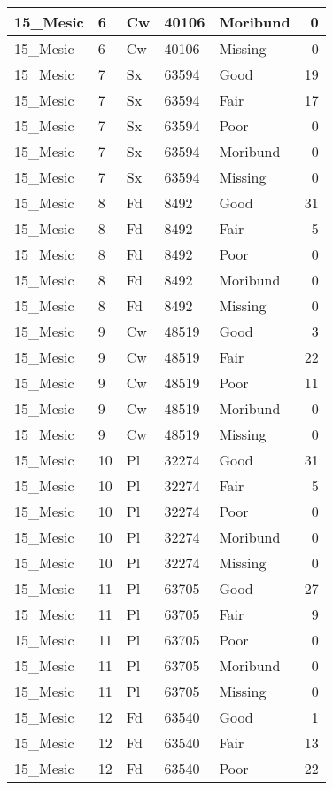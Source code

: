 \documentclass[
]{article}
\begin{document}
\begin{tabular}{l|l|l|l|l|r}
\hline
15\_Mesic & 6 & Cw & 40106 & Moribund & 0\\
\hline
15\_Mesic & 6 & Cw & 40106 & Missing & 0\\
\hline
15\_Mesic & 7 & Sx & 63594 & Good & 19\\
\hline
15\_Mesic & 7 & Sx & 63594 & Fair & 17\\
\hline
15\_Mesic & 7 & Sx & 63594 & Poor & 0\\
\hline
15\_Mesic & 7 & Sx & 63594 & Moribund & 0\\
\hline
15\_Mesic & 7 & Sx & 63594 & Missing & 0\\
\hline
15\_Mesic & 8 & Fd & 8492 & Good & 31\\
\hline
15\_Mesic & 8 & Fd & 8492 & Fair & 5\\
\hline
15\_Mesic & 8 & Fd & 8492 & Poor & 0\\
\hline
15\_Mesic & 8 & Fd & 8492 & Moribund & 0\\
\hline
15\_Mesic & 8 & Fd & 8492 & Missing & 0\\
\hline
15\_Mesic & 9 & Cw & 48519 & Good & 3\\
\hline
15\_Mesic & 9 & Cw & 48519 & Fair & 22\\
\hline
15\_Mesic & 9 & Cw & 48519 & Poor & 11\\
\hline
15\_Mesic & 9 & Cw & 48519 & Moribund & 0\\
\hline
15\_Mesic & 9 & Cw & 48519 & Missing & 0\\
\hline
15\_Mesic & 10 & Pl & 32274 & Good & 31\\
\hline
15\_Mesic & 10 & Pl & 32274 & Fair & 5\\
\hline
15\_Mesic & 10 & Pl & 32274 & Poor & 0\\
\hline
15\_Mesic & 10 & Pl & 32274 & Moribund & 0\\
\hline
15\_Mesic & 10 & Pl & 32274 & Missing & 0\\
\hline
15\_Mesic & 11 & Pl & 63705 & Good & 27\\
\hline
15\_Mesic & 11 & Pl & 63705 & Fair & 9\\
\hline
15\_Mesic & 11 & Pl & 63705 & Poor & 0\\
\hline
15\_Mesic & 11 & Pl & 63705 & Moribund & 0\\
\hline
15\_Mesic & 11 & Pl & 63705 & Missing & 0\\
\hline
15\_Mesic & 12 & Fd & 63540 & Good & 1\\
\hline
15\_Mesic & 12 & Fd & 63540 & Fair & 13\\
\hline
15\_Mesic & 12 & Fd & 63540 & Poor & 22\\

\end{tabular}
\end{document}
